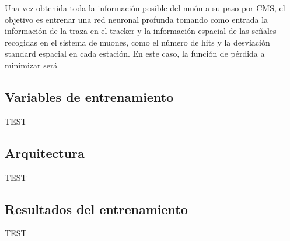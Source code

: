 
Una vez obtenida toda la informaci\'on posible del mu\'on a su paso por CMS, el objetivo es entrenar una red neuronal profunda tomando como entrada la informaci\'on de la traza en el tracker y la informaci\'on espacial de las señales recogidas en el sistema de muones, como el n\'umero de hits y la desviaci\'on standard espacial en cada estaci\'on. En este caso, la funci\'on de p\'erdida a minimizar ser\'a 




\subsection{Variables de entrenamiento}\label{variables}

TEST

\subsection{Arquitectura}\label{arch}

TEST

\subsection{Resultados del entrenamiento}\label{trainresults}

TEST
